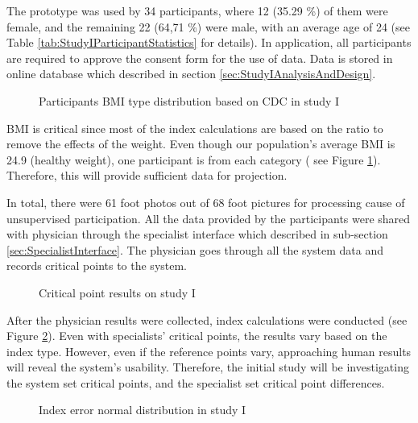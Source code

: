 The prototype was used by 34 participants, where 12 (35.29 \%) of them were female, and the remaining 22 (64,71 \%) were male, with an average age of 24 (see Table \ref{tab:StudyIParticipantStatistics} for details). In application, all participants are required to approve the consent form for the use of data. Data is stored in online database which described in section \ref{sec:StudyIAnalysisAndDesign}. 

\begin{figure}[htbp]
\centering
{}
\caption{Participants BMI type distribution based on CDC in study I}
\label{fig:StudyIParticipantsBMITypeDistribution}
\end{figure}

BMI is critical since most of the index calculations are based on the ratio to remove the effects of the weight. Even though our population's average BMI is 24.9 (healthy weight), one participant is from each category ( see Figure \ref{fig:StudyIParticipantsBMITypeDistribution}). Therefore, this will provide sufficient data for projection.

In total, there were 61 foot photos out of 68 foot pictures for processing cause of unsupervised participation. All the data provided by the participants were shared with physician through the specialist interface which described in sub-section \ref{sec:SpecialistInterface}. The physician goes through all the system data and records critical points to the system.

\begin{figure}[htbp]
\centering
{}
\caption{Critical point results on study I}
\label{fig:StudyICriticalPointResult}
\end{figure}

After the physician results were collected, index calculations were conducted (see Figure  \ref{fig:StudyICriticalPointResult}). Even with specialists' critical points, the results vary based on the index type. However, even if the reference points vary, approaching human results will reveal the system's usability. Therefore, the initial study will be investigating the system set critical points, and the specialist set critical point differences.

\begin{figure}[htbp]
\centering
{}
\caption{Index error normal distribution in study I}
\label{fig:StudyIIndexErrorNormalDists}
\end{figure}

